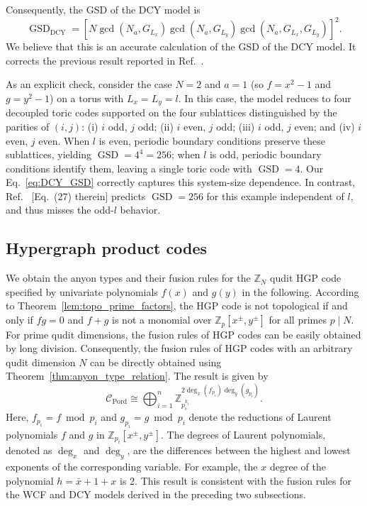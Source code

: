 \documentclass[aps,prb,english,superscriptaddress,twocolumn,tightenlines,showpacs,longbibliography,floatfix,amsfonts]{revtex4-2}
\newcommand{\gsd}{\operatorname{GSD}}
\begin{document}
Consequently, the GSD of the DCY model is
\begin{equation}
    \gsd_{\operatorname{DCY}}=\left[N\gcd(N_a,G_{L_x})\gcd(N_a,G_{L_y})\gcd(N_a,G_{L_x},G_{L_y})\right]^2. \label{eq:DCY_GSD}
\end{equation}
We believe that this is an accurate calculation of the GSD of the DCY model. It corrects the previous result reported in Ref.~\cite{Delfino2023_2}.


As an explicit check, consider the case $N=2$ and $a=1$ (so $f=x^2-1$ and $g=y^2-1$) on a torus with $L_x=L_y=l$. In this case, the model reduces to four decoupled toric codes supported on the four sublattices distinguished by the parities of $(i,j)$: (i) $i$ odd, $j$ odd; (ii) $i$ even, $j$ odd; (iii) $i$ odd, $j$ even; and (iv) $i$ even, $j$ even. When $l$ is even, periodic boundary conditions preserve these sublattices, yielding $\operatorname{GSD}=4^4=256$; when $l$ is odd, periodic boundary conditions identify them, leaving a single toric code with $\operatorname{GSD}=4$. Our Eq.~\eqref{eq:DCY_GSD} correctly captures this system-size dependence. In contrast, Ref.~\cite{Delfino2023_2} [Eq.~(27) therein] predicts $\operatorname{GSD}=256$ for this example independent of $l$, and thus misses the odd-$l$ behavior.

\subsection{Hypergraph product codes\label{sec6c}}
We obtain the anyon types and their fusion rules for the $\mathbb{Z}_N$ qudit HGP code specified by univariate polynomials $f(x)$ and $g(y)$ in the following. According to Theorem~\ref{lem:topo_prime_factors}, the HGP code is not topological if and only if $fg=0$ and $f+g$ is not a monomial over $\mathbb{Z}_p[x^\pm,y^\pm]$ for all primes $p\mid N$.
For prime qudit dimensions, the fusion rules of HGP codes can be easily obtained by long division. Consequently, the fusion rules of HGP codes with an arbitrary qudit dimension $N$ can be directly obtained using Theorem~\ref{thm:anyon_type_relation}. The result is given by
\begin{equation}
    \mathcal{C}_{\operatorname{Pord}}\cong\bigoplus_{i=1}^n\mathbb{Z}_{p_i^{k_i}}^{2\operatorname{deg}_x(f_{p_i})\operatorname{deg}_y(g_{p_i})}.\label{eq:anyon_type_uni}
\end{equation}
Here, $f_{p_i}=f\bmod p_i$ and $g_{p_i}=g\bmod p_i$ denote the reductions of Laurent polynomials $f$ and $g$ in $\mathbb{Z}_{p_i}[x^{\pm},y^{\pm}]$. The degrees of Laurent polynomials, denoted as $\operatorname{deg}_x$ and $\operatorname{deg}_y$, are the differences between the highest and lowest exponents of the corresponding variable. For example, the $x$ degree of the polynomial $h=\bar{x}+1+x$ is 2. This result is consistent with the fusion rules for the WCF and DCY models derived in the preceding two subsections.
\end{document}
